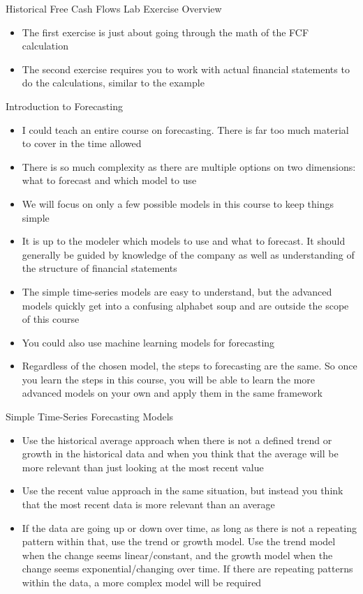 \documentclass[]{article}
\begin{document}
\begin{section}{Historical Free Cash Flows Lab Exercise Overview}
\begin{itemize}
\item The first exercise is just about going through the math of the FCF calculation
\item The second exercise requires you to work with actual financial statements to do the calculations, similar to the example
\end{itemize}
\end{section}
\begin{section}{Introduction to Forecasting}
\begin{itemize}
\item I could teach an entire course on forecasting. There is far too much material to cover in the time allowed
\item There is so much complexity as there are multiple options on two dimensions: what to forecast and which model to use
\item We will focus on only a few possible models in this course to keep things simple
\item It is up to the modeler which models to use and what to forecast. It should generally be guided by knowledge of the company as well as understanding of the structure of financial statements
\item The simple time-series models are easy to understand, but the advanced models quickly get into a confusing alphabet soup and are outside the scope of this course
\item You could also use machine learning models for forecasting
\item Regardless of the chosen model, the steps to forecasting are the same. So once you learn the steps in this course, you will be able to learn the more advanced models on your own and apply them in the same framework
\end{itemize}
\end{section}
\begin{section}{Simple Time-Series Forecasting Models}
\begin{itemize}
\item Use the historical average approach when there is not a defined trend or growth in the historical data and when you think that the average will be more relevant than just looking at the most recent value
\item Use the recent value approach in the same situation, but instead you think that the most recent data is more relevant than an average
\item If the data are going up or down over time, as long as there is not a repeating pattern within that, use the trend or growth model. Use the trend model when the change seems linear/constant, and the growth model when the change seems exponential/changing over time. If there are repeating patterns within the data, a more complex model will be required
\end{itemize}
\end{section}
\end{document}
